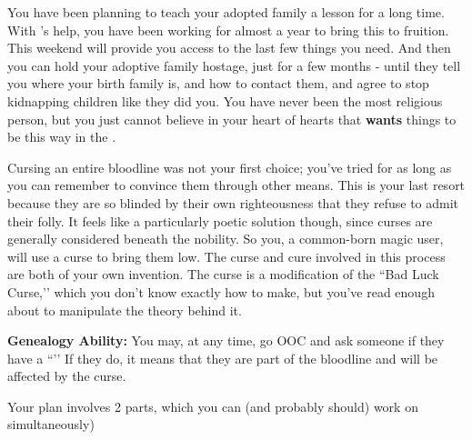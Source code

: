 \documentclass[green]{GL2020}
\begin{document}
\name{\gPunishKidnappers{}}

You have been planning to teach your adopted family a lesson for a long time. With \cLibAssist{\full}’s help, you have been working for almost a year to bring this to fruition. This weekend will provide you access to the last few things you need. And then you can hold your adoptive family hostage, just for a few months - until they tell you where your birth family is, and how to contact them, and agree to stop kidnapping children like they did you. You have never been the most religious person, but you just cannot believe in your heart of hearts that \cFarmGod{} \textbf{wants} things to be this way in the \pFarm{}.

Cursing an entire bloodline was not your first choice; you’ve tried for as long as you can remember to convince them through other means. This is your last resort because they are so blinded by their own righteousness that they refuse to admit their folly. It feels like a particularly poetic solution though, since curses are generally considered beneath the nobility. So you, a common-born magic user, will use a curse to bring them low. The curse and cure involved in this process are both of your own invention. The curse is a modification of the ``Bad Luck Curse,’’ which you don’t know exactly how to make, but you’ve read enough about to manipulate the theory behind it.

\textbf{Genealogy Ability:} You may, at any time, go OOC and ask someone if they have a ``\mCPacket{\MYname}’’ If they do, it means that they are part of the \cAdopted{\formal} bloodline and will be affected by the curse.

Your plan involves 2 parts, which you can (and probably should) work on simultaneously)
\end{document}

